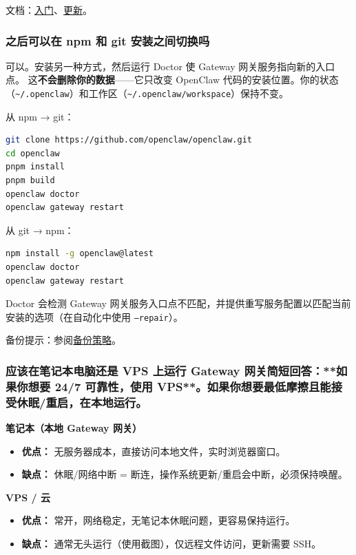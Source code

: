 文档：\href{/start/getting-started}{入门}、\href{/install/updating}{更新}。

\subsubsection{之后可以在 npm 和 git 安装之间切换吗}


可以。安装另一种方式，然后运行 Doctor 使 Gateway 网关服务指向新的入口点。
这\textbf{不会删除你的数据}——它只改变 OpenClaw 代码的安装位置。你的状态
（\texttt{\textasciitilde{}/.openclaw}）和工作区（\texttt{\textasciitilde{}/.openclaw/workspace}）保持不变。

从 npm → git：

\begin{lstlisting}[language=bash]
git clone https://github.com/openclaw/openclaw.git
cd openclaw
pnpm install
pnpm build
openclaw doctor
openclaw gateway restart
\end{lstlisting}


从 git → npm：

\begin{lstlisting}[language=bash]
npm install -g openclaw@latest
openclaw doctor
openclaw gateway restart
\end{lstlisting}


Doctor 会检测 Gateway 网关服务入口点不匹配，并提供重写服务配置以匹配当前安装的选项（在自动化中使用 \texttt{--repair}）。

备份提示：参阅\href{/help/faq\#whats-the-recommended-backup-strategy}{备份策略}。

\subsubsection{应该在笔记本电脑还是 VPS 上运行 Gateway 网关简短回答：**如果你想要 24/7 可靠性，使用 VPS**。如果你想要最低摩擦且能接受休眠/重启，在本地运行。}


\textbf{笔记本（本地 Gateway 网关）}

\begin{itemize}
  \item \textbf{优点：} 无服务器成本，直接访问本地文件，实时浏览器窗口。
  \item \textbf{缺点：} 休眠/网络中断 = 断连，操作系统更新/重启会中断，必须保持唤醒。
\end{itemize}


\textbf{VPS / 云}

\begin{itemize}
  \item \textbf{优点：} 常开，网络稳定，无笔记本休眠问题，更容易保持运行。
  \item \textbf{缺点：} 通常无头运行（使用截图），仅远程文件访问，更新需要 SSH。
\end{itemize}


